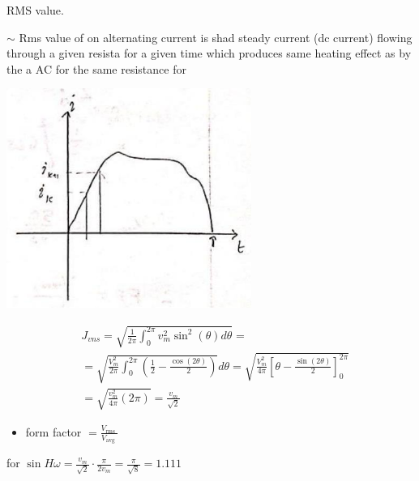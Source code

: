 \documentclass[12pt, a4paper]{article}
\newcommand{\figwidth}{8cm}
\begin{document}
	RMS value.

$\sim$ Rms value of on alternating current is shad steady current (dc current) flowing through a given resista for a given time which produces same heating effect as by the a AC for the same resistance for

	\begin{center}
		\includegraphics[max width=\figwidth]{2024_06_15_74bbabba7981675b0d49g-01(5)}
	\end{center}

	$$
		\begin{aligned}
			 & J_{v n s}=\sqrt{\frac{1}{2 \pi} \int_{0}^{2 \pi} v_{m}^{2} \sin ^{2}(\theta) d \theta}=                                                                                                             \\
			 & =\sqrt{\frac{V_{m}^{2}}{2 \pi} \int_{0}^{2 \pi}\left(\frac{1}{2}-\frac{\cos (2 \theta)}{2}\right)} d \theta=\sqrt{\frac{V_{m}^{2}}{4 \pi}\left[\theta-\frac{\sin (2 \theta)}{2}\right]_{0}^{2 \pi}} \\
			 & =\sqrt{\frac{v_{m}^{2}}{4 \pi}(2 \pi)}=\frac{v_{m}}{\sqrt{2}}
		\end{aligned}
	$$

	\begin{itemize}
		\item form factor $=\frac{V_{\text {rms }}}{V_{\text {avg }}}$
	\end{itemize}

	for $\sin H \omega=\frac{v_{m}}{\sqrt{2}} \cdot \frac{\pi}{2 v_{m}}=\frac{\pi}{\sqrt{8}}=1.111$
\end{document}
